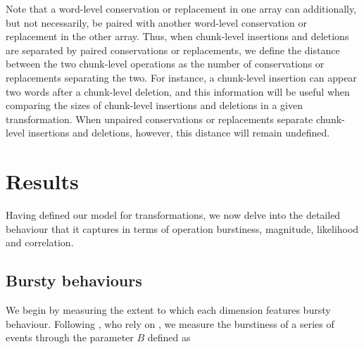 Note that a word-level conservation or replacement in one array can
additionally, but not necessarily, be paired with another word-level
conservation or replacement in the other array. Thus, when chunk-level
insertions and deletions are separated by paired conservations or
replacements, we define the distance between the two chunk-level
operations as the number of conservations or replacements separating the
two. For instance, a chunk-level insertion can appear two words after a
chunk-level deletion, and this information will be useful when comparing
the sizes of chunk-level insertions and deletions in a given
transformation.  When unpaired conservations or replacements separate
chunk-level insertions and deletions, however, this distance will remain
undefined.


\section{Results}\label{sec:gistr-results-inner}

Having defined our model for transformations, we now delve into the
detailed behaviour that it captures in terms of operation burstiness, magnitude, likelihood and correlation.

\subsection{Bursty behaviours}\label{bursty-behaviours}

We begin by measuring the extent to which each dimension features bursty
behaviour. Following \textcite{jo_circadian_2012}, who rely on
\textcite{goh_burstiness_2008}, we measure the burstiness of a series of
events through the parameter \(B\) defined as

